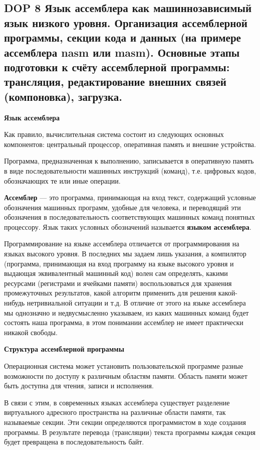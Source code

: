 \subsection*{DOP 8 Язык  ассемблера  как  машиннозависимый  язык  низкого  уровня.  Организация  ассемблерной  программы, секции кода и данных (на примере ассемблера nasm или masm). Основные  этапы подготовки к счёту ассемблерной программы: трансляция, редактирование внешних связей (компоновка), загрузка.}

\textbf{Язык ассемблера}

Как правило, вычислительная система состоит из следующих основных компонентов: центральный процессор, оперативная память и внешние устройства.

Программа, предназначенная к выполнению, записывается в оперативную память в виде последовательности машинных инструкций (команд), т.е. цифровых кодов, обозначающих те или иные операции.

\textbf{Ассемблер} --- это программа, принимающая на вход текст, содержащий условные обозначения машинных программ, удобные для человека, и переводящий эти обозначения в последовательность соответствующих машинных команд понятных процессору.
Язык таких условных обозначений называется \textbf{языком ассемблера}.

Программирование на языке ассемблера отличается от программирования на языках высокого уровня.
В последних мы задаем лишь указания, а компилятор (программа, принимающая на вход программу на языке высокого уровня и выдающая эквивалентный машинный код) волен сам определять, какими ресурсами (регистрами и ячейками памяти) воспользоваться для хранения промежуточных результатов, какой алгоритм применить для решения какой-нибудь нетривиальной ситуации и т.д.
В отличие от этого на языке ассемблера мы однозначно и недвусмысленно указываем, из каких машинных команд будет состоять наша программа, в этом понимании ассемблер не имеет практически никакой свободы.

\textbf{Структура ассемблерной программы}

Операционная система может установить пользовательской программе разные возможности по доступу к различным областям памяти. Область памяти может быть доступна для чтения, записи и исполнения.

В связи с этим, в современных языках ассемблера существует разделение виртуального адресного пространства на различные области памяти, так называемые секции.
Эти секции определяются программистом в ходе создания программы.
В результате перевода (трансляции) текста программы каждая секция будет превращена в последовательность байт.

